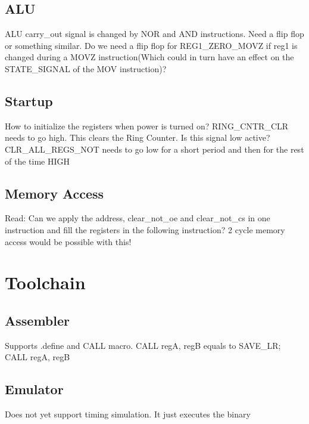 \documentclass[a4paper, 12pt]{article}
\begin{document}
		\subsection{ALU}
			ALU carry\_out signal is changed by NOR and AND instructions. Need a flip flop or something similar.
			Do we need a flip flop for REG1\_ZERO\_MOVZ if reg1 is changed during a MOVZ instruction(Which could in turn have an effect on the STATE\_SIGNAL of the MOV instruction)?
		\subsection{Startup}
			How to initialize the registers when power is turned on?
			RING\_CNTR\_CLR needs to go high. This clears the Ring Counter. Is this signal low active?
			CLR\_ALL\_REGS\_NOT needs to go low for a short period and then for the rest of the time HIGH
		\subsection{Memory Access}
			Read: Can we apply the address, clear\_not\_oe and clear\_not\_cs in one instruction and fill the registers in the following instruction? 2 cycle memory access would be possible with this!
	\section{Toolchain}
		\subsection{Assembler}
			Supports .define  and CALL macro. CALL regA, regB equals to SAVE\_LR; CALL regA, regB
		\subsection{Emulator}
			Does not yet support timing simulation. It just executes the binary
\end{document}
